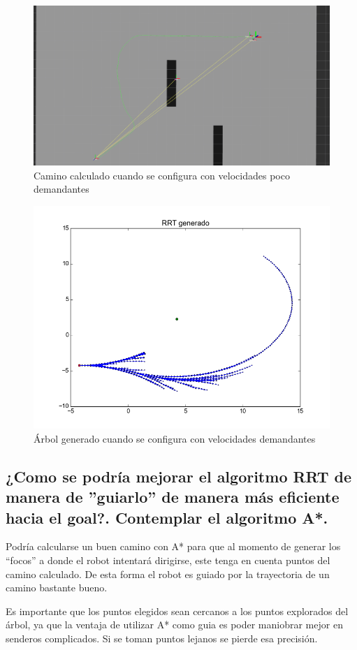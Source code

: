 \documentclass[a4paper]{article}
\theoremstyle{plain}
\theoremstyle{remark}
\theoremstyle{definition}
\begin{document}
\begin{figure}[ht]
    \begin{center}
        \includegraphics[scale=0.35]{imagenes/rviz_poco_demandante.png}
        \caption{Camino calculado cuando se configura con velocidades poco demandantes}
    \end{center}
\end{figure}

\begin{figure}[ht]
    \begin{center}
        \includegraphics[scale=0.8]{imagenes/arbol_demandante.png}
        \caption{Árbol generado cuando se configura con velocidades demandantes}
    \end{center}
\end{figure}

\FloatBarrier
\subsection{¿Como se podría mejorar el algoritmo RRT de manera de ”guiarlo” de manera
más eficiente hacia el goal?. Contemplar el algoritmo A*.}

Podría calcularse un buen camino con A* para que al momento de generar los ``focos'' a donde el robot intentará dirigirse, este tenga en cuenta puntos del camino calculado. De esta forma el robot es guiado por la trayectoria de un camino bastante bueno.

Es importante que los puntos elegidos sean cercanos a los puntos explorados del árbol, ya que la ventaja de utilizar A* como guia es poder maniobrar mejor en senderos complicados. Si se toman puntos lejanos se pierde esa precisión.
\end{document}
